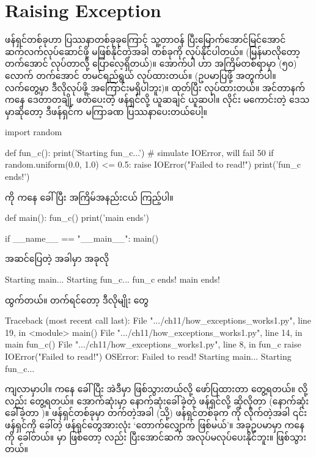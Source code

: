 \section{Raising Exception}
ဖန်ရှင်တစ်ခုဟာ ပြဿနာတစ်ခုခုကြောင့် သူ့တာဝန် ပြီးမြောက်အောင်မြင်အောင် ဆက်လက်လုပ်ဆောင်ဖို့ မဖြစ်နိုင်တဲ့အခါ  တစ်ခုကို   လုပ်နိုင်ပါတယ်။ (မြန်မာလိုတော့  တက်အောင် လုပ်တာလို့ ပြောလေ့ရှိတယ်)။ အောက်ပါ  ဟာ အကြိမ်တစ်ရာမှာ (၅၀) လောက်   တက်အောင်  တမင်ရည်ရွယ် လုပ်ထားတယ်။ (ဥပမာပြဖို့ အတွက်ပါ။ လက်တွေ့မှာ ဒီလိုလုပ်ဖို့ အကြောင်းမရှိပါဘူး)။  ထုတ်ပြီး  လုပ်ထားတယ်။ အင်တာနက်ကနေ ဒေတာတချို့ ဖတ်ပေးတဲ့ ဖန်ရှင်လို့ ယူဆချင် ယူဆပါ။  လိုင်း မကောင်းတဲ့ ဒေသမှာဆိုတော့ ဒီဖန်ရှင်က မကြာခဏ ပြဿနာပေးတယ်ပေါ့။  

%
\begin{py}
import random

def fun_c():
    print('Starting fun_c...')
    # simulate IOError, will fail 50%
    if random.uniform(0.0, 1.0) <= 0.5:
        raise IOError("Failed to read!")
    print('fun_c ends!')
\end{py}
%
 ကို  ကနေ ခေါ်ပြီး အကြိမ်အနည်းငယ်  ကြည့်ပါ။
%
\begin{py}
def main():
    fun_c()
    print('main ends')

if __name__ == "__main__":
    main()
\end{py}
%

အဆင်ပြေတဲ့ အခါမှာ အခုလို
\begin{codetxt}
Starting main...
Starting fun_c...
fun_c ends!
main ends!
\end{codetxt}
ထွက်တယ်။  တက်ရင်တော့ ဒီလိုမျိုး   တွေ
\begin{codetxt}
Traceback (most recent call last):
  File ".../ch11/how_exceptions_works1.py", line 19, in <module>
    main()
  File ".../ch11/how_exceptions_works1.py", line 14, in main
    fun_c()
  File ".../ch11/how_exceptions_works1.py", line 8, in fun_c
    raise IOError("Failed to read!")
OSError: Failed to read!
Starting main...
Starting fun_c...
\end{codetxt}
ကျလာမှာပါ။  ကနေ  ခေါ်ပြီး အဲဒီမှာ  ဖြစ်သွားတယ်လို့ ဖော်ပြထားတာ တွေ့ရတယ်။  လို့လည်း တွေ့ရတယ်။ အောက်ဆုံးမှာ နောက်ဆုံးခေါ်ခဲ့တဲ့ ဖန်ရှင်လို့ ဆိုလိုတာ (နောက်ဆုံး ခေါ်ခဲ့တာ )။ ဖန်ရှင်တစ်ခုမှာ  တက်တဲ့အခါ (သို့) ဖန်ရှင်တစ်ခုက  ကို  လိုက်တဲ့အခါ ၎င်းဖန်ရှင်ကို ခေါ်တဲ့ ဖန်ရှင်တွေအားလုံး ‘တောက်လျှောက်  ဖြစ်မယ်’။ အခုဥပမာမှာ  ကနေ  ကို ခေါ်တယ်။  မှာ  ဖြစ်တော့  လည်း ပြီးအောင်ဆက် အလုပ်မလုပ်ပေးနိုင်ဘူး။  ဖြစ်သွားတယ်။

